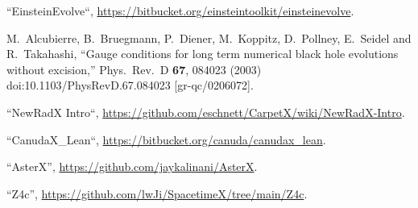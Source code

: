 \begin{thebibliography}{9}

 ``EinsteinEvolve``,
  \url{https://bitbucket.org/einsteintoolkit/einsteinevolve}.

  M.~Alcubierre, B.~Bruegmann, P.~Diener, M.~Koppitz, D.~Pollney, E.~Seidel and R.~Takahashi,
  ``Gauge conditions for long term numerical black hole evolutions without excision,''
  Phys.\ Rev.\ D {\bf 67}, 084023 (2003)
  doi:10.1103/PhysRevD.67.084023
  [gr-qc/0206072].

 ``NewRadX Intro``,
  \url{https://github.com/eschnett/CarpetX/wiki/NewRadX-Intro}.

 ``CanudaX\_Lean``,
  \url{https://bitbucket.org/canuda/canudax_lean}.

 ``AsterX'',
  \url{https://github.com/jaykalinani/AsterX}.

 ``Z4c'',
  \url{https://github.com/lwJi/SpacetimeX/tree/main/Z4c}.

\end{thebibliography}



